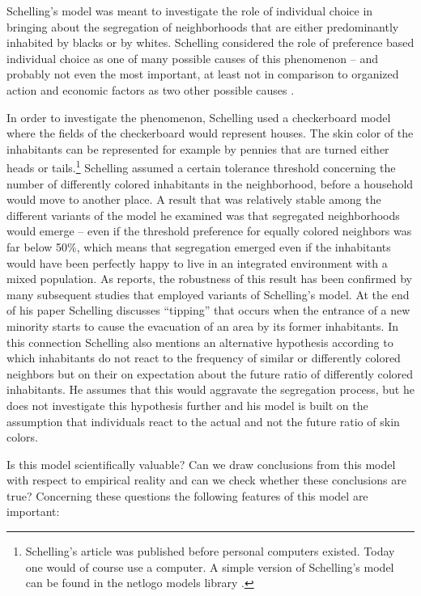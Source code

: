 \documentclass[12pt, english, a4paper]{article}
\begin{document}
Schelling’s model was meant to investigate the role of individual
choice in bringing about the segregation of neighborhoods that are
either predominantly inhabited by blacks or by whites. Schelling
considered the role of preference based individual choice as one of
many possible causes of this phenomenon – and probably not even the
most important, at least not in comparison to organized action and
economic factors as two other possible causes
\citep[144]{schelling:1971}.

In order to investigate the phenomenon, Schelling used a checkerboard
model where the fields of the checkerboard would represent houses. The
skin color of the inhabitants can be represented for example by
pennies that are turned either heads or tails.\footnote{Schelling’s
  article was published before personal computers existed. Today one
  would of course use a computer.  A simple version of Schelling’s
  model can be found in the netlogo models library
  \citep{Wilensky1999}.} Schelling assumed a certain tolerance
threshold concerning the number of differently colored inhabitants in
the neighborhood, before a household would move to another place. A
result that was relatively stable among the different variants of the
model he examined was that segregated neighborhoods would emerge –
even if the threshold preference for equally colored neighbors was far
below 50\%, which means that segregation emerged even if the
inhabitants would have been perfectly happy to live in an integrated
environment with a mixed population. As \citet{aydinonat:2007}
reports, the robustness of this result has been confirmed by many
subsequent studies that employed variants of Schelling’s model. At the
end of his paper Schelling discusses “tipping” that occurs when the
entrance of a new minority starts to cause the evacuation of an area
by its former inhabitants. In this connection Schelling also mentions
an alternative hypothesis according to which inhabitants do not react
to the frequency of similar or differently colored neighbors but on
their on expectation about the future ratio of differently colored
inhabitants. He assumes that this would aggravate the segregation
process, but he does not investigate this hypothesis further
\citep[185-186]{schelling:1971} and his model is built on the
assumption that individuals react to the actual and not the future
ratio of skin colors.

Is this model scientifically valuable? Can we draw conclusions from
this model with respect to empirical reality and can we check whether
these conclusions are true? Concerning these questions the following
features of this model are important:
\end{document}
